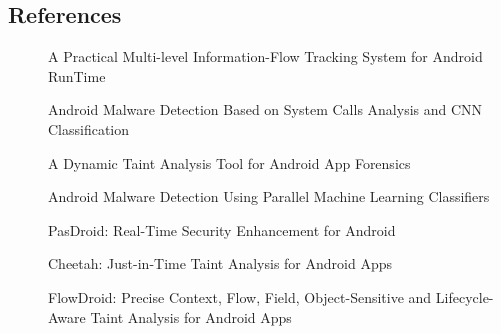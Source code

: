 \documentclass{article}
\begin{document}
%   


\subsection{References}
  \begin{description}
    \item[\cite{Sun2016CCS}] A Practical Multi-level Information-Flow Tracking System for Android RunTime
    \item[\cite{ABDE2019WCNCW}] Android Malware Detection Based on System Calls Analysis and CNN Classification
    \item[\cite{Xu2018SPW}] A Dynamic Taint Analysis Tool for Android App Forensics
    \item[\cite{Yerima2014NGMAST}] Android Malware Detection Using Parallel Machine Learning Classifiers
    \item[\cite{Hsiao2014IMIS}] PasDroid: Real-Time Security Enhancement for Android
    \item[\cite{Ngu2017ICSE}] Cheetah: Just-in-Time Taint Analysis for Android Apps
    \item[\cite{Arzt2014SIGPLAN}]  FlowDroid: Precise Context, Flow, Field, Object-Sensitive and Lifecycle-Aware Taint Analysis for Android Apps
  \end{description}
  \label{sec:TaintDroid} 
  
\end{document}
